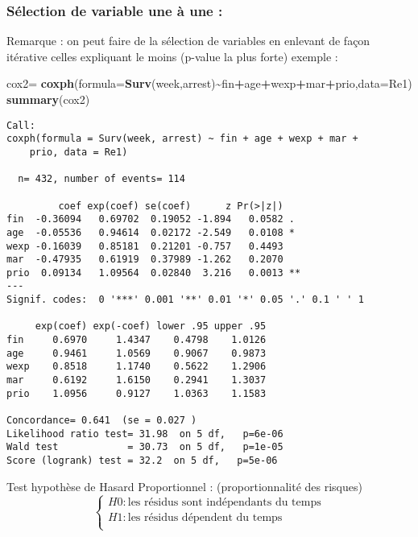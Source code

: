 \documentclass[
]{article}
\newenvironment{Shaded}{\begin{snugshade}}{\end{snugshade}}
\newcommand{\AttributeTok}[1]{\textcolor[rgb]{0.13,0.29,0.53}{#1}}
\newcommand{\FunctionTok}[1]{\textcolor[rgb]{0.13,0.29,0.53}{\textbf{#1}}}
\newcommand{\NormalTok}[1]{#1}
\newcommand{\OtherTok}[1]{\textcolor[rgb]{0.56,0.35,0.01}{#1}}
\newcommand{\SpecialCharTok}[1]{\textcolor[rgb]{0.81,0.36,0.00}{\textbf{#1}}}
\begin{document}
\hypertarget{suxe9lection-de-variable-une-uxe0-une}{%
\subsubsection{Sélection de variable une à une
:}\label{suxe9lection-de-variable-une-uxe0-une}}

Remarque : on peut faire de la sélection de variables en enlevant de
façon itérative celles expliquant le moins (p-value la plus forte)
exemple :

\begin{Shaded}
\begin{Highlighting}[]
\NormalTok{cox2}\OtherTok{=} \FunctionTok{coxph}\NormalTok{(}\AttributeTok{formula=}\FunctionTok{Surv}\NormalTok{(week,arrest)}\SpecialCharTok{\textasciitilde{}}\NormalTok{fin}\SpecialCharTok{+}\NormalTok{age}\SpecialCharTok{+}\NormalTok{wexp}\SpecialCharTok{+}\NormalTok{mar}\SpecialCharTok{+}\NormalTok{prio,}\AttributeTok{data=}\NormalTok{Re1)}
\FunctionTok{summary}\NormalTok{(cox2)}
\end{Highlighting}
\end{Shaded}

\begin{verbatim}
Call:
coxph(formula = Surv(week, arrest) ~ fin + age + wexp + mar + 
    prio, data = Re1)

  n= 432, number of events= 114 

         coef exp(coef) se(coef)      z Pr(>|z|)   
fin  -0.36094   0.69702  0.19052 -1.894   0.0582 . 
age  -0.05536   0.94614  0.02172 -2.549   0.0108 * 
wexp -0.16039   0.85181  0.21201 -0.757   0.4493   
mar  -0.47935   0.61919  0.37989 -1.262   0.2070   
prio  0.09134   1.09564  0.02840  3.216   0.0013 **
---
Signif. codes:  0 '***' 0.001 '**' 0.01 '*' 0.05 '.' 0.1 ' ' 1

     exp(coef) exp(-coef) lower .95 upper .95
fin     0.6970     1.4347    0.4798    1.0126
age     0.9461     1.0569    0.9067    0.9873
wexp    0.8518     1.1740    0.5622    1.2906
mar     0.6192     1.6150    0.2941    1.3037
prio    1.0956     0.9127    1.0363    1.1583

Concordance= 0.641  (se = 0.027 )
Likelihood ratio test= 31.98  on 5 df,   p=6e-06
Wald test            = 30.73  on 5 df,   p=1e-05
Score (logrank) test = 32.2  on 5 df,   p=5e-06
\end{verbatim}

Test hypothèse de Hasard Proportionnel : (proportionnalité des risques)
\[
\left\{
\begin{array}{l}
H0 : \text{les résidus sont indépendants du temps} \\
H1 : \text{les résidus dépendent du temps} \\
\end{array}
\right.
\]
\end{document}
